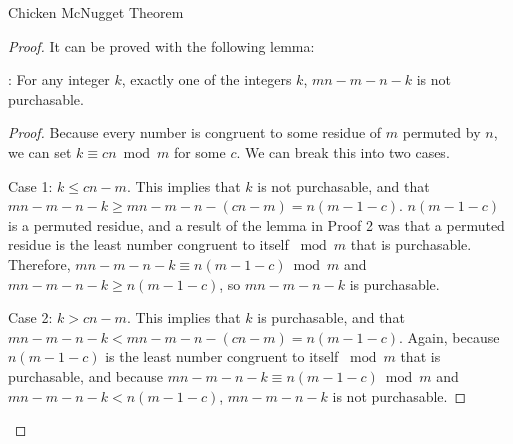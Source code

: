 \begin{mysubsection}{Chicken McNugget Theorem}
    \begin{proof}
        It can be proved with the following lemma:

        : For any integer $k$, exactly one of the integers $k$, $mn-m-n-k$ is not purchasable.
        \begin{proof}
            Because every number is congruent to some residue of $m$ permuted by $n$, we can set $k \equiv cn \bmod m$ for some $c$. We can break this into two cases.

            Case 1: $k \leq cn-m$. This implies that $k$ is not purchasable, and that $mn-m-n-k \geq mn-m-n-(cn-m) = n(m-1-c)$. $n(m-1-c)$ is a permuted residue, and a result of the lemma in Proof 2 was that a permuted residue is the least number congruent to itself $\bmod m$ that is purchasable. Therefore, $mn-m-n-k \equiv n(m-1-c) \bmod m$ and $mn-m-n-k \geq n(m-1-c)$, so $mn-m-n-k$ is purchasable.

            Case 2: $k > cn-m$. This implies that $k$ is purchasable, and that $mn-m-n-k < mn-m-n-(cn-m) = n(m-1-c)$. Again, because $n(m-1-c)$ is the least number congruent to itself $\bmod m$ that is purchasable, and because $mn-m-n-k \equiv n(m-1-c) \bmod m$ and $mn-m-n-k < n(m-1-c)$, $mn-m-n-k$ is not purchasable. 
        \end{proof}
    \end{proof}
\end{mysubsection}

\begin{shortque}[]{}

\end{shortque}
